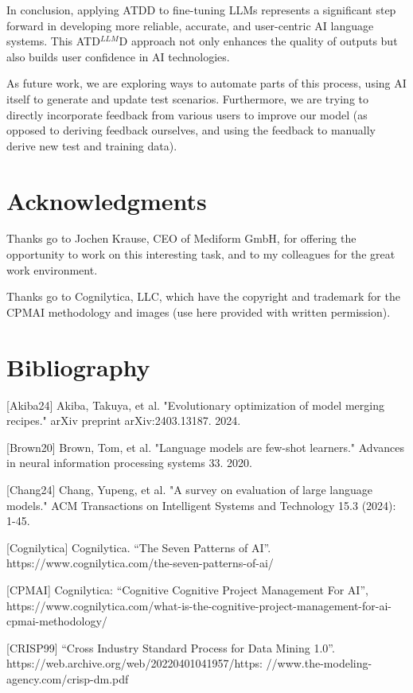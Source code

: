 \documentclass[twocolumn]{article}
\newcommand{\ATDLLMD}{ATD$^{LLM}$D}%
\begin{document}
In conclusion, applying ATDD to fine-tuning LLMs represents a significant step forward in developing more reliable, accurate, and user-centric AI language systems. This \ATDLLMD{} approach not only enhances the quality of outputs but also builds user confidence in AI technologies.

As future work, we are exploring ways to automate parts of this process, using AI itself to generate and update test scenarios. Furthermore, we are trying to directly incorporate feedback from various users to improve our model (as opposed to deriving feedback ourselves, and using the feedback to manually derive new test and training data).


\section{Acknowledgments}

Thanks go to Jochen Krause, CEO of Mediform GmbH, for offering the opportunity to work on this interesting task, and to my colleagues for the great work environment.

Thanks go to Cognilytica, LLC, which have the copyright and trademark for the CPMAI methodology and images (use here provided with written permission).


\section{Bibliography}

\hspace{3ex}[Akiba24] Akiba, Takuya, et al. "Evolutionary optimization of model merging recipes." arXiv preprint arXiv:2403.13187. 2024.

[Brown20] Brown, Tom, et al. "Language models are few-shot learners." Advances in neural information processing systems 33. 2020.

[Chang24] Chang, Yupeng, et al. "A survey on evaluation of large language models." ACM Transactions on Intelligent Systems and Technology 15.3 (2024): 1-45.

[Cognilytica] Cognilytica. “The Seven Patterns of AI”. https://www.cognilytica.com/the-seven-patterns-of-ai/

[CPMAI] Cognilytica: “Cognitive Cognitive Project Management For AI”, https://www.cognilytica.com/what-is-the-cognitive-project-management-for-ai-cpmai-methodology/

[CRISP99] “Cross Industry Standard Process for Data Mining 1.0”. https://web.archive.org/web/20220401041957/https:
//www.the-modeling-agency.com/crisp-dm.pdf
\end{document}

